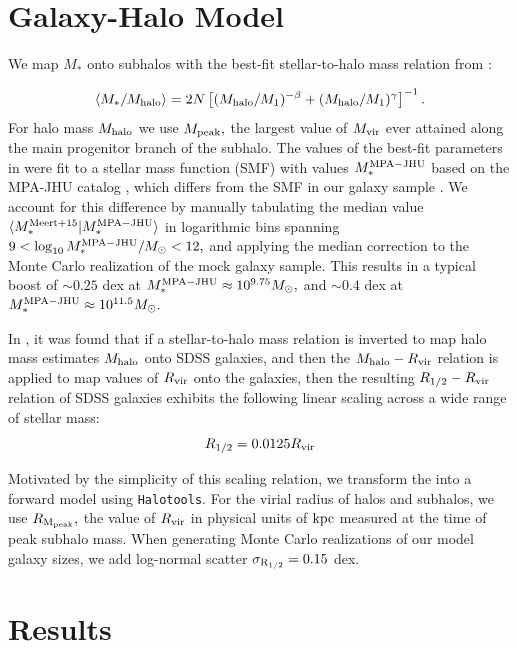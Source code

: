 \documentclass[usenatbib,usegraphicx,letterpaper]{mn2e}
\newcommand{\beq}{\begin{equation}}
\newcommand{\eeq}{\end{equation}}
\newcommand{\rhalf}{R_{1/2}}
\newcommand{\sigmarhalf}{\sigma_{\rm R_{1/2}}}
\newcommand{\mstar}{M_{\ast}}
\newcommand{\mvir}{M_{\rm vir}}
\newcommand{\mpeak}{M_{\rm peak}}
\newcommand{\mhalo}{M_{\rm halo}}
\newcommand{\rvir}{R_{\rm vir}}
\newcommand{\rmpeak}{R_{\rm M_{peak}}}
\newcommand{\kpc}{{\rm kpc}}
\newcommand{\msun}{M_\odot}
\begin{document}
\section{Galaxy-Halo Model}
\label{sec:model}

We map $\mstar$ onto subhalos with the best-fit stellar-to-halo mass relation from \citet{moster_etal13}:

\begin{equation*}
\langle\mstar/\mhalo\rangle = 2N\left[(\mhalo/M_{1})^{-\beta} + (\mhalo/M_1)^{\gamma}\right]^{-1}.
\end{equation*}
For halo mass $\mhalo$ we use $\mpeak,$ the largest value of $\mvir$ ever attained along the main progenitor branch of the subhalo. The values of the best-fit parameters in \citet{moster_etal13} were fit to a stellar mass function (SMF) with values $\mstar^{\rm MPA-JHU}$ based on the MPA-JHU catalog \citep{kauffmann_etal03,brinchmann_etal04}, which differs from the SMF in our galaxy sample \citep[see, e.g.,][]{bernardi_etal14}. We account for this difference by manually tabulating the median value $\langle\mstar^{\rm Meert+15}\vert\mstar^{\rm MPA-JHU}\rangle$ in logarithmic bins spanning $9 < \log_{10}\mstar^{\rm MPA-JHU}/\msun < 12,$ and applying the median correction to the Monte Carlo realization of the mock galaxy sample. This results in a typical boost of $\sim0.25$ dex at $\mstar^{\rm MPA-JHU}\approx10^{9.75}\msun,$ and $\sim0.4$ dex at $\mstar^{\rm MPA-JHU}\approx10^{11.5}\msun.$ 

In \citet{kravtsov13}, it was found that if a stellar-to-halo mass relation is inverted to map halo mass estimates $\mhalo$ onto SDSS galaxies, and then the $\mhalo-\rvir$ relation is applied to map values of $\rvir$ onto the galaxies, then the resulting $\rhalf-\rvir$ relation of SDSS galaxies exhibits the following linear scaling across a wide range of stellar mass:
\beq
\label{eq:fiducial_model}
\rhalf = 0.0125\rvir
\eeq

Motivated by the simplicity of this scaling relation, we transform the \citet{kravtsov13} into a forward model using {\tt Halotools}. For the virial radius of halos and subhalos, we use $\rmpeak,$ the value of $\rvir$ in physical units of $\kpc$ measured at the time of peak subhalo mass. When generating Monte Carlo realizations of our model galaxy sizes, we add log-normal scatter $\sigmarhalf=0.15$ dex.

\section{Results}
\label{sec:results}
\end{document}
